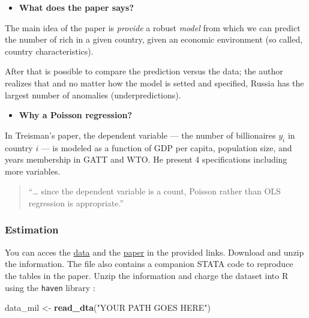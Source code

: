 \documentclass[]{book}
\newenvironment{Shaded}{\begin{snugshade}}{\end{snugshade}}
\newcommand{\KeywordTok}[1]{\textcolor[rgb]{0.13,0.29,0.53}{\textbf{#1}}}
\newcommand{\StringTok}[1]{\textcolor[rgb]{0.31,0.60,0.02}{#1}}
\newcommand{\NormalTok}[1]{#1}
\providecommand{\tightlist}{%
  \setlength{\itemsep}{0pt}\setlength{\parskip}{0pt}}
\begin{document}
\begin{itemize}
\tightlist
\item
  \textbf{What does the paper says?}
\end{itemize}

The main idea of the paper is \emph{provide} a robust \emph{model} from
which we can predict the number of rich in a given country, given an
economic environment (so called, country characteristics).

After that is possible to compare the prediction versus the data; the
author realizes that and no matter how the model is setted and
specified, Russia has the largest number of anomalies
(underpredictions).

\begin{itemize}
\tightlist
\item
  \textbf{Why a Poisson regression?}
\end{itemize}

In Treisman's paper, the dependent variable --- the number of
billionaires \(y_i\) in country \(i\) --- is modeled as a function of
GDP per capita, population size, and years membership in GATT and WTO.
He present 4 specifications including more variables.

\begin{quote}
``\ldots{} since the dependent variable is a count, Poisson rather than
OLS regression is appropriate.''
\end{quote}

\subsubsection{Estimation}\label{estimation}

You can acces the
\href{https://www.aeaweb.org/aer/data/10605/P2016_1068_data.zip}{data}
and the
\href{https://pubs.aeaweb.org/doi/pdfplus/10.1257/aer.p20161068}{paper}
in the provided links. Download and unzip the information. The file also
contains a companion STATA code to reproduce the tables in the paper.
Unzip the information and charge the dataset into R using the
\texttt{haven} library \citep{R-haven}:

\begin{Shaded}
\begin{Highlighting}[]
\NormalTok{data_mil <-}\StringTok{ }\KeywordTok{read_dta}\NormalTok{(}\StringTok{"YOUR PATH GOES HERE"}\NormalTok{)}
\end{Highlighting}
\end{Shaded}
\end{document}
